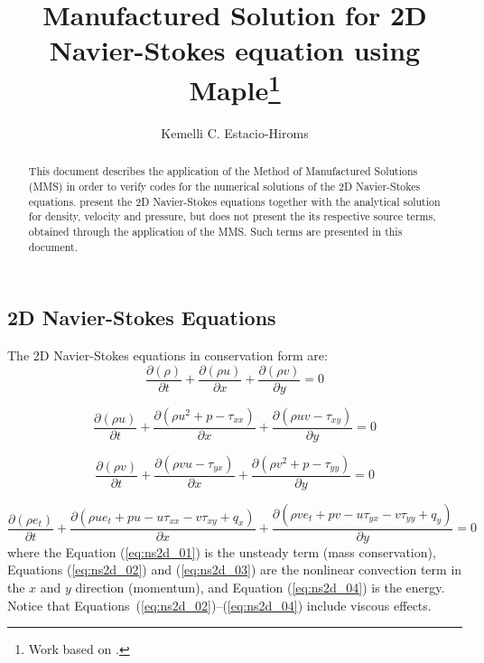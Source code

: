 \documentclass[10pt]{article}
\title{Manufactured Solution for 2D Navier-Stokes equation using Maple\footnote{Work based on \citet*{Roy2002}.}}
\author{Kemelli C. Estacio-Hiroms}
\newcommand{\Diff}[2] {\dfrac{\partial( #1)}{\partial #2}}
\begin{document}
\begin{landscape}

\maketitle

\begin{abstract}
This document describes the application of the Method of Manufactured Solutions (MMS) in order to verify codes for the numerical solutions of the 2D Navier-Stokes equations. \citet{Roy2002}  present the 2D Navier-Stokes equations together with the analytical solution for density, velocity and pressure, but does not present the its respective source terms, obtained through the application of the MMS. Such terms are presented in this document.
\end{abstract}





\section{2D Navier-Stokes Equations}
The 2D Navier-Stokes equations in conservation form are:
\begin{equation}
 \label{eq:ns2d_01}
\Diff{\rho}{t} + \Diff{\rho u}{x}+\Diff{\rho v}{y} = 0
\end{equation}


\begin{equation}
 \label{eq:ns2d_02}
\Diff{\rho u}{t} + \Diff{\rho u^2 + p - \tau_{xx}}{x}+\Diff{\rho uv-\tau_{xy}}{y} = 0
\end{equation}


\begin{equation}
 \label{eq:ns2d_03}
\Diff{\rho v}{t} + \Diff{\rho vu - \tau_{yx}}{x}+\Diff{\rho v^2+p-\tau_{yy}}{y} = 0
\end{equation}


\begin{equation}
 \label{eq:ns2d_04}
\Diff{\rho e_t}{t} + \Diff{\rho ue_t +pu -u \tau_{xx}- v\tau_{xy} +q_x}{x}+\Diff{\rho ve_t +pv- u \tau_{yx} -v \tau_{yy} + q_y}{y} = 0
\end{equation}
%
where the Equation (\ref{eq:ns2d_01}) is the unsteady term (mass conservation), Equations (\ref{eq:ns2d_02}) and (\ref{eq:ns2d_03}) are the nonlinear convection term in the $x$ and $y$ direction (momentum), and Equation (\ref{eq:ns2d_04}) is the energy. Notice that Equations~(\ref{eq:ns2d_02})--(\ref{eq:ns2d_04}) include viscous effects.


\end{landscape}
\end{document}
